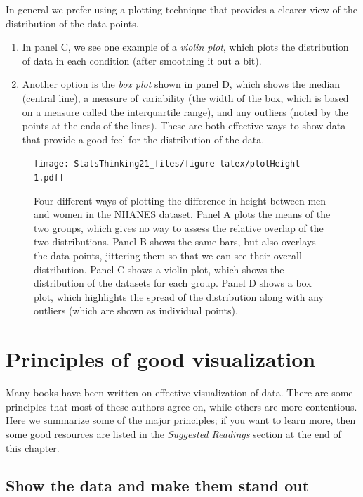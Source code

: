 \documentclass[12pt,]{book}
\providecommand{\tightlist}{%
  \setlength{\itemsep}{0pt}\setlength{\parskip}{0pt}}
\theoremstyle{definition}
\theoremstyle{definition}
\theoremstyle{definition}
\theoremstyle{remark}
\begin{document}
In general we prefer using a plotting technique that provides a clearer view of the distribution of the data points.

\begin{enumerate}
\def\labelenumi{\arabic{enumi}.}
\setcounter{enumi}{2}
\tightlist
\item
  In panel C, we see one example of a \emph{violin plot}, which plots the distribution of data in each condition (after smoothing it out a bit).\\
\item
  Another option is the \emph{box plot} shown in panel D, which shows the median (central line), a measure of variability (the width of the box, which is based on a measure called the interquartile range), and any outliers (noted by the points at the ends of the lines). These are both effective ways to show data that provide a good feel for the distribution of the data.
\end{enumerate}

\begin{figure}
\centering
\texttt{[image: StatsThinking21\_files/figure-latex/plotHeight-1.pdf]}
\caption{\label{fig:plotHeight}Four different ways of plotting the difference in height between men and women in the NHANES dataset. Panel A plots the means of the two groups, which gives no way to assess the relative overlap of the two distributions. Panel B shows the same bars, but also overlays the data points, jittering them so that we can see their overall distribution. Panel C shows a violin plot, which shows the distribution of the datasets for each group. Panel D shows a box plot, which highlights the spread of the distribution along with any outliers (which are shown as individual points).}
\end{figure}

\hypertarget{principles-of-good-visualization}{%
\section{Principles of good visualization}\label{principles-of-good-visualization}}

Many books have been written on effective visualization of data. There are some principles that most of these authors agree on, while others are more contentious. Here we summarize some of the major principles; if you want to learn more, then some good resources are listed in the \emph{Suggested Readings} section at the end of this chapter.

\hypertarget{show-the-data-and-make-them-stand-out}{%
\subsection{Show the data and make them stand out}\label{show-the-data-and-make-them-stand-out}}
\end{document}
